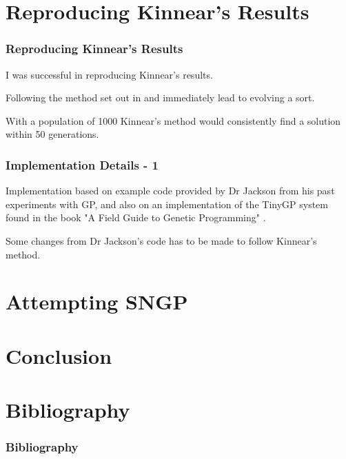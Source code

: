 \documentclass{beamer}
\begin{document}
	\section{Reproducing Kinnear's Results}
	
		\begin{frame}
		
			\frametitle{Reproducing Kinnear's Results}
			
			I was successful in reproducing Kinnear's results.
			
			\pause
			
			Following the method set out in \cite{kinnear_generality_1993} and \cite{kinnear_evolving_1993} immediately lead to evolving a sort.
			
			\pause
			
			With a population of 1000 Kinnear's method would consistently find a solution within 50 generations.
			
		\end{frame}
	
		\begin{frame}
		
			\frametitle{Implementation Details - 1}
			
			Implementation based on example code provided by Dr Jackson from his past experiments with GP, and also on an implementation of the TinyGP system found in the book "A Field Guide to Genetic Programming" \cite{poli_field_2008}.
			
			Some changes from Dr Jackson's code has to be made to follow Kinnear's method.
		
		\end{frame}
	
	\section{Attempting SNGP}
	
	\section{Conclusion}
	
	\section{Bibliography}
	
		\begin{frame}[allowframebreaks] 
			\frametitle{Bibliography}
			
			
		\end{frame}
		
\end{document}
